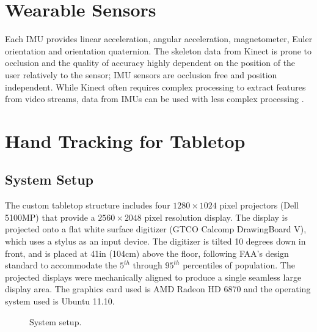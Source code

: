 \section{Wearable Sensors}
Each IMU provides linear acceleration, angular acceleration, magnetometer, Euler
orientation and orientation quaternion. The skeleton data from Kinect is prone
to occlusion and the quality of accuracy highly dependent on the position of the
user relatively to the sensor; IMU sensors are occlusion free and position
independent. While Kinect often requires complex processing to extract features
from video streams, data from IMUs can be used with less complex processing
\cite{Ruffieux2013}.

\section{Hand Tracking for Tabletop}
\subsection{System Setup}
The custom tabletop structure includes four $1280\times1024$ pixel projectors 
(Dell 5100MP) that provide a $2560\times2048$ pixel resolution display. The
display is projected onto a flat white surface digitizer (GTCO Calcomp DrawingBoard V), 
which uses a stylus as an input device. The digitizer is tilted 10 degrees down 
in front, and is placed at 41in (104cm) above the floor, following FAA's design 
standard to accommodate the $5^{th}$ through $95^{th}$ percentiles of 
population. The projected displays were mechanically aligned to produce a single 
seamless large display area. The graphics card used is AMD
Radeon HD 6870 and the operating system used is Ubuntu 11.10.

\begin{figure}
  \centering
  \caption{System setup.} \label{fig:setup}
\end{figure}

